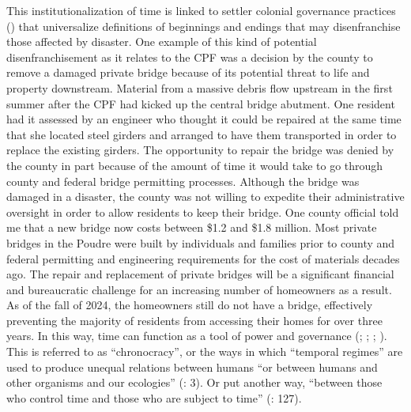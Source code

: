 \documentclass[
]{article}
\begin{document}
This institutionalization of time is linked to settler colonial governance practices () that universalize definitions of beginnings and endings that may disenfranchise those affected by disaster. One example of this kind of potential disenfranchisement as it relates to the CPF was a decision by the county to remove a damaged private bridge because of its potential threat to life and property downstream. Material from a massive debris flow upstream in the first summer after the CPF had kicked up the central bridge abutment. One resident had it assessed by an engineer who thought it could be repaired at the same time that she located steel girders and arranged to have them transported in order to replace the existing girders. The opportunity to repair the bridge was denied by the county in part because of the amount of time it would take to go through county and federal bridge permitting processes. Although the bridge was damaged in a disaster, the county was not willing to expedite their administrative oversight in order to allow residents to keep their bridge. One county official told me that a new bridge now costs between \$1.2 and \$1.8 million. Most private bridges in the Poudre were built by individuals and families prior to county and federal permitting and engineering requirements for the cost of materials decades ago. The repair and replacement of private bridges will be a significant financial and bureaucratic challenge for an increasing number of homeowners as a result. As of the fall of 2024, the homeowners still do not have a bridge, effectively preventing the majority of residents from accessing their homes for over three years. In this way, time can function as a tool of power and governance (; ; ; ). This is referred to as ``chronocracy'', or the ways in which ``temporal regimes'' are used to produce unequal relations between humans ``or between humans and other organisms and our ecologies'' (: 3). Or put another way, ``between those who control time and those who are subject to time'' (: 127).
\end{document}
